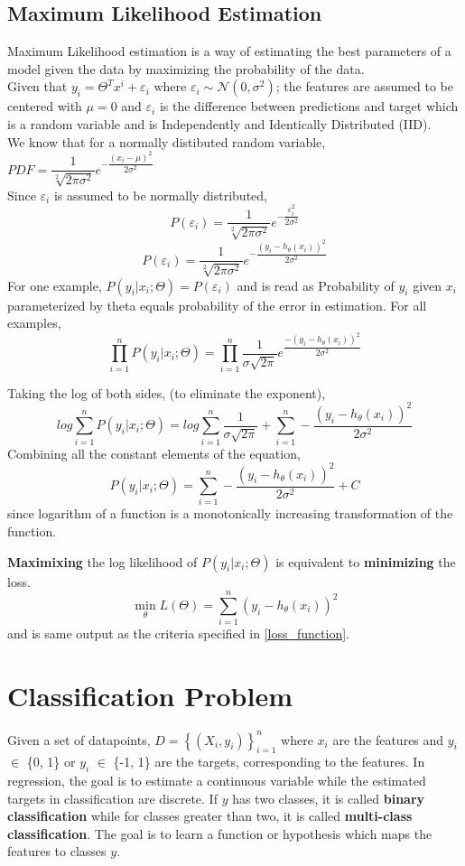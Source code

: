 \documentclass[12pt,a4paper,titlepage,landscape]{book}
\begin{document}
	\subsection{Maximum Likelihood Estimation}
	Maximum Likelihood estimation is a way of estimating the best parameters of a model given the data by maximizing the probability of the data.\\
	Given that $y_i = \Theta^Tx^i + \varepsilon_i$
	where $\varepsilon_i \sim \mathcal{N}(0, \sigma^2)$; the features are assumed to be centered with $\mu = 0$ and $\varepsilon_i$ is the difference between predictions and target which is a random variable and is Independently and Identically Distributed (IID). \\
	We know that for a normally distibuted random variable, $PDF = \dfrac{1}{\sqrt[2]{2\pi\sigma^2}}e^{-\dfrac{(x_i-\mu)^2}{2\sigma^2}}$ \\
	Since $\varepsilon_i$ is assumed to be normally distributed, 
	$$P(\varepsilon_i) = \dfrac{1}{\sqrt[2]{2\pi\sigma^2}}e^{-\dfrac{\varepsilon_i^2}{2\sigma^2}}$$
	$$P(\varepsilon_i) = \dfrac{1}{\sqrt[2]{2\pi\sigma^2}}e^{-\dfrac{(y_i - h_\theta(x_i))^2}{2\sigma^2}}$$
	For one example, $P(y_i | x_i;\Theta) = P(\varepsilon_i)$ and is read as Probability of $y_i$ given $x_i$ parameterized by theta equals probability of the error in estimation. For all examples,
	$$\prod_{i=1}^{n}P(y_i | x_i; \Theta) = \prod_{i=1}^{n}\dfrac{1}{\sigma\sqrt{2\pi}}e^{\dfrac{-(y_i - h_\theta(x_i))^2}{2\sigma^2}}$$
	
	Taking the log of both sides, (to eliminate the exponent),
	$$log \sum_{i=1}^{n}P(y_i | x_i;\Theta) = log \sum_{i=1}^{n}\dfrac{1}{\sigma\sqrt{2\pi}} + \sum_{i=1}^{n}-\dfrac{(y_i - h_\theta(x_i))^2}{2\sigma^2}$$
	Combining all the constant elements of the equation,
	$$P(y_i | x_i;\Theta) = \sum_{i=1}^{n}-\dfrac{(y_i - h_\theta(x_i))^2}{2\sigma^2} + C$$ since logarithm of a function is a monotonically increasing transformation of the function. 
	
	\textbf{Maximixing} the log likelihood of $P(y_i | x_i; \Theta)$ is equivalent to \textbf{minimizing} the loss.
	$$\min\limits_\theta{L(\Theta) }= \sum_{i=1}^{n}(y_i - h_\theta(x_i))^2$$ and is same output as the criteria specified in \eqref{loss_function}.
	
	\section{Classification Problem}
	Given a set of datapoints, $ D = \left\{\left(X_i, y_i\right)\right\}_{i=1}^n $ where $x_i$ are the features and $y_i$ $\in$ \{0, 1\} or $y_i$ $\in$ \{-1, 1\}  are the targets, corresponding to the features. In regression, the goal is to estimate a continuous variable while the estimated targets in classification are discrete. If $y$ has two classes, it is called \textbf{binary classification} while for classes greater than two, it is called \textbf{multi-class classification}.   The goal is to learn  a function or hypothesis which maps the features to classes $y$. \\
	 
\end{document}

